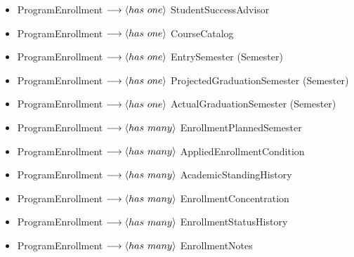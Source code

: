 \documentclass[12pt]{article}
\begin{document}
\begin{appendices}
\begin{enumerate}[label=(\roman*)]
\begin{itemize}
        \item ProgramEnrollment $ \longrightarrow \langle has \hspace{0.125cm} one \rangle $ StudentSuccessAdvisor
        \item ProgramEnrollment $ \longrightarrow \langle has \hspace{0.125cm} one \rangle $ CourseCatalog
        \item ProgramEnrollment $ \longrightarrow \langle has \hspace{0.125cm} one \rangle $ EntrySemester (Semester)
        \item ProgramEnrollment $ \longrightarrow \langle has \hspace{0.125cm} one \rangle $ ProjectedGraduationSemester (Semester)
        \item ProgramEnrollment $ \longrightarrow \langle has \hspace{0.125cm} one \rangle $ ActualGraduationSemester (Semester)
        \item ProgramEnrollment $ \longrightarrow \langle has \hspace{0.125cm} many \rangle $ EnrollmentPlannedSemester
        \item ProgramEnrollment $ \longrightarrow \langle has \hspace{0.125cm} many \rangle $ AppliedEnrollmentCondition
        \item ProgramEnrollment $ \longrightarrow \langle has \hspace{0.125cm} many \rangle $ AcademicStandingHistory
        \item ProgramEnrollment $ \longrightarrow \langle has \hspace{0.125cm} many \rangle $ EnrollmentConcentration
        \item ProgramEnrollment $ \longrightarrow \langle has \hspace{0.125cm} many \rangle $ EnrollmentStatusHistory
        \item ProgramEnrollment $ \longrightarrow \langle has \hspace{0.125cm} many \rangle $ EnrollmentNotes
    \end{itemize}


\end{enumerate}
\end{appendices}
\end{document}
